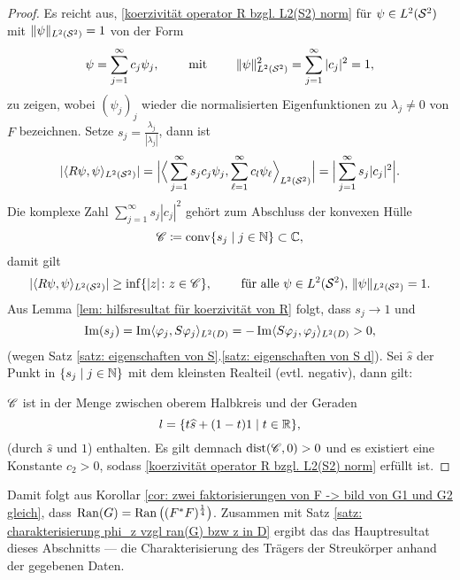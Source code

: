 \begin{proof}
	Es reicht aus, \eqref{koerzivität operator R bzgl. L2(S2) norm} für \(\psi\in L^2(\mathcal{S}^2)\) mit \(\|\psi\|_{L^2(\mathcal{S}^2)}=1\) von der Form
	\begin{equation*}
		\psi=\sum_{j=1}^\infty c_j\psi_j,\qquad\text{ mit }\qquad\|\psi\|_{L^2(\mathcal{S}^2)}^2=\sum_{j=1}^\infty|c_j|^2=1,
	\end{equation*}
	zu zeigen, wobei \((\psi_j)_j\) wieder die normalisierten Eigenfunktionen zu \(\lambda_j\neq0\) von \(F\) bezeichnen. Setze \(s_j=\frac{\lambda_j}{|\lambda_j|}\), dann ist
	\begin{equation*}
		|\langle R\psi, \psi\rangle_{L^2(\mathcal{S}^2)}|
		=\Big|\Big\langle \sum_{j=1}^\infty s_jc_j\psi_j, \sum_{\ell=1}^\infty c_l\psi_\ell\Big\rangle_{L^2(\mathcal{S}^2)}\Big|
		=\Big|\sum_{j=1}^\infty s_j|c_j|^2\Big|.
	\end{equation*}
	Die komplexe Zahl \(\sum_{j=1}^\infty s_j|c_j|^2\) gehört zum Abschluss der konvexen Hülle
	\begin{equation*}
		\mathscr{C}\coloneqq\operatorname{conv}\{s_j\mid j\in\mathbb{N}\}\subset\mathbb{C},
	\end{equation*}
	damit gilt
	\begin{equation*}
		|\langle R\psi, \psi\rangle_{L^2(\mathcal{S}^2)}|\geq\inf\{|z|\colon z\in\mathscr{C}\},
		\qquad\text{ für alle }\psi\in L^2(\mathcal{S}^2),\,\|\psi\|_{L^2(\mathcal{S}^2)}=1.
	\end{equation*}
	Aus Lemma \ref{lem: hilfsresultat für koerzivität von R} folgt, dass \(s_j\to1\) und 
	\begin{equation*}
		\operatorname{Im}(s_j)=\operatorname{Im}\langle \varphi_j,S\varphi_j\rangle_{L^2(D)}=-\operatorname{Im}\langle S\varphi_j,\varphi_j\rangle_{L^2(D)}>0,
	\end{equation*}
	(wegen Satz \ref{satz: eigenschaften von S}.\ref{satz: eigenschaften von S d}). Sei \(\widehat{s}\) der Punkt in \(\{s_j\mid j\in\mathbb{N}\}\) mit dem kleinsten Realteil (evtl. negativ), dann gilt:\vspace{1mm}
	
	\(\mathscr{C}\) ist in der Menge zwischen oberem Halbkreis und der Geraden
	\begin{equation*}
		l=\{t\widehat{s}+(1-t)1\mid t\in\mathbb{R}\},
	\end{equation*}
	(durch \(\widehat{s}\) und \(1\)) enthalten. Es gilt demnach \(\operatorname{dist}(\mathscr{C},0)>0\) und es existiert eine Konstante \(c_2>0\), sodass \eqref{koerzivität operator R bzgl. L2(S2) norm} erfüllt ist.
\end{proof}
Damit folgt aus Korollar \ref{cor: zwei faktorisierungen von F -> bild von G1 und G2 gleich}, dass \(\operatorname{Ran}(G)=\operatorname{Ran}\big((F^\ast F)^\frac{1}{4}\big)\). Zusammen mit Satz \ref{satz: charakterisierung phi_z vzgl ran(G) bzw z in D} ergibt das das Hauptresultat dieses Abschnitts --- die Charakterisierung des Trägers der Streukörper anhand der gegebenen Daten.
